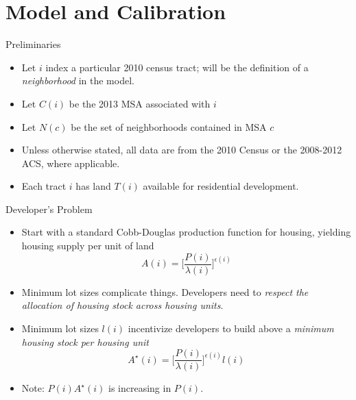 \documentclass{beamer}
\theoremstyle{plain}
\begin{document}
\section{Model and Calibration}
\begin{frame}{Preliminaries}
	\begin{itemize}
		\color{black}
		\itemsep1em
		\item Let $i$ index a particular 2010 census tract; will be the definition of a \textit{neighborhood} in the model.  \pause
		
		\item Let $C(i)$ be the 2013 MSA associated with $i$ \pause
		
		\item Let $N(c)$ be the set of neighborhoods contained in MSA $c$ \pause
		
		\item Unless otherwise stated, all data are from the 2010 Census or the 2008-2012 ACS, where applicable. \pause
		
		\item Each tract $i$ has land $T(i)$ available for residential  development.  
	\end{itemize}
\end{frame}


\begin{frame}{Developer's Problem}
	\begin{itemize}
		\color{black}
		\item Start with a standard Cobb-Douglas production function for housing, yielding housing supply per unit of land
		\begin{equation}
		A(i) = \bigg[\frac{P(i)}{\lambda(i)}\bigg]^{\epsilon(i)}
		\end{equation} \pause
		
		
		\item Minimum lot sizes complicate things. Developers need to \color{red}\textit{respect the allocation of housing stock across housing units}\color{black}.
		
		\item Minimum lot sizes $l(i)$ incentivize developers to build above a \textit{minimum housing stock per housing unit}   \pause
		\begin{equation}
			A^{\star}(i) = \bigg[\frac{P(i)}{\lambda(i)}\bigg]^{\epsilon(i)}l(i)
		\end{equation}
	\item Note: $P(i)A^{\star}(i)$ is increasing in $P(i)$. 
	\end{itemize}
\end{frame}
\end{document}
